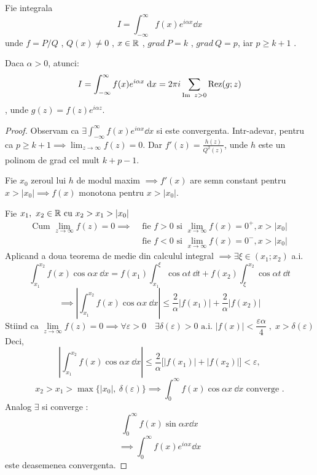 \begin{tip}
    Fie integrala
    \[
        I = \int_{-\infty}^{\infty} f(x) e^{i \alpha x}\dd x
    \]
    unde $f=P/Q$ , $Q(x)\neq 0$ , $x \in \mathbb{R}$ , $grad\ P = k$ , $grad\ Q =p$,
    iar $p \geq k+1$ .

    Daca $\alpha > 0$, atunci:
    \[
        I = \int_{-\infty}^{\infty} f(x) e^{i \alpha x}\; \mathrm{d} x
            =2 \pi i \sum_{\operatorname{Im}\ z >0} \operatorname{Rez}(g;z)
    \]
    , unde $g(z) = f(z) e^{i \alpha z}$.

    \begin{proof}
        Observam ca
        $\displaystyle
            \exists \int_{-\infty}^{\infty} f(x) e^{i \alpha x}\dd x
        $
        si este convergenta.
        Intr-adevar, pentru ca $\displaystyle p\geq k+1 \implies \lim_{z\to\infty}f(z) = 0$.
        Dar $\displaystyle f'(z) = \frac{h(z)}{Q^2(z)}$, unde $h$ este un polinom
        de grad cel mult $k+p-1$.

        Fie $x_0$ zeroul lui $h$ de modul maxim $\implies f'(x)$
        are semn constant pentru $x>|x_0| \implies f(x) $ monotona pentru $x>|x_0|$.

        Fie $x_1,\ x_2 \in \mathbb{R} \text{ cu } x_2 > x_1 > |x_0|$
        \[
            \begin{aligned}
            \text{Cum } \lim_{z\to\infty} f(z) = 0 \implies
                &\text{ fie } f>0 \text{ si } \lim_{x\to\infty} f(x) = 0^+ , x >|x_0|\\
                &\text{ fie } f<0 \text{ si } \lim_{x\to\infty} f(x) = 0^- , x >|x_0|
            \end{aligned}
        \]
        Aplicand a doua teorema de medie din calculul integral
        $\implies \exists \xi \in (x_1;x_2)$ a.i.
        \[
            \int_{x_1}^{x_2} f(x) \cos \alpha x\ \dd x
                = f(x_1) \int_{x_1}^{\xi} \cos \alpha t\ \dd t
                + f(x_2) \int_{\xi}^{x_2} \cos \alpha t\ \dd t
        \]
        \[
            \implies \left | \int_{x_1}^{x_2} f(x) \cos \alpha x\ \dd x  \right |
                \leq \frac{2}{\alpha} |f(x_1)| + \frac{2}{\alpha} |f(x_2)|
        \]
        \[
            \text{Stiind ca } \lim_{z\to\infty} f(z) = 0 \implies
                \forall \varepsilon > 0 \quad \exists \delta(\varepsilon) > 0 \text{ a.i. } |f(x)|<\frac{\varepsilon \alpha }{4}
            \;,\; x > \delta(\varepsilon)
        \]
        Deci,
        \[
            \left | \int_{x_1}^{x_2} f(x) \cos \alpha x\ \dd x  \right |
                \leq \frac{2}{\alpha} \big[ |f(x_1)|+ |f(x_2)| \big] < \varepsilon ,
        \]
        \[
            x_2 > x_1 > \max\{|x_0|,\ \delta(\varepsilon)\}
                \implies \int_{0}^{\infty} f(x)\cos \alpha x\ \dd x
                \text{ converge }.
        \]
        Analog $\exists$ si converge :
        \[
            \int_{0}^{\infty} f(x)\sin \alpha x \dd x
        \]
        \[
            \implies \int_{0}^{\infty} f(x) e^{i \alpha x} \dd x
        \]
        este deasemenea convergenta.


\end{proof}
\end{tip}

